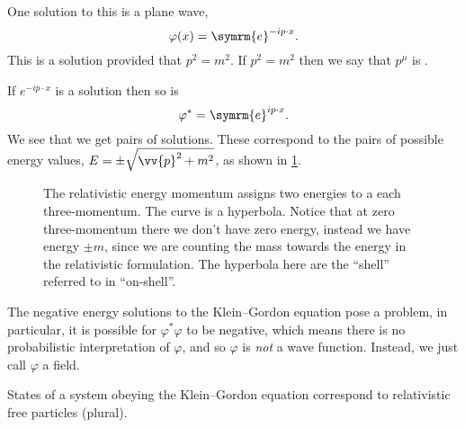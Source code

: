 \documentclass[fleqn]{NotesClass}
\newcommand{\e}{\symrm{e}}
\begin{document}
    One solution to this is a plane wave,
    \begin{equation}
        \varphi(x) = \e^{-ip \cdot x}.
    \end{equation}
    This is a solution provided that \(p^2 = m^2\).
    If \(p^2 = m^2\) then we say that \(p^\mu\) is .
    
    If \(e^{-ip\cdot x}\) is a solution then so is
    \begin{equation}
        \varphi^* = \e^{ip\cdot x}.
    \end{equation}
    We see that we get pairs of solutions.
    These correspond to the pairs of possible energy values, \(E = \pm \sqrt{\vv{p}^2 + m^2}\), as shown in \cref{fig:energy-momentum relation relativistic}.
    
    \begin{figure}
        \caption{The relativistic energy momentum assigns two energies to a each three-momentum. The curve is a hyperbola. Notice that at zero three-momentum there we don't have zero energy, instead we have energy \(\pm m\), since we are counting the mass towards the energy in the relativistic formulation. The hyperbola here are the \enquote{shell} referred to in \enquote{on-shell}.}
        \label{fig:energy-momentum relation relativistic}
    \end{figure}
    
    The negative energy solutions to the Klein--Gordon equation pose a problem, in particular, it is possible for \(\varphi^* \varphi\) to be negative, which means there is no probabilistic interpretation of \(\varphi\), and so \(\varphi\) is \emph{not} a wave function.
    Instead, we just call \(\varphi\) a field.
    
    States of a system obeying the Klein--Gordon equation correspond to relativistic free particles (plural).
    
\end{document}
